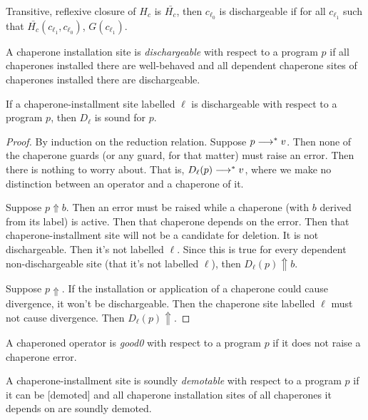 Transitive, reflexive closure of $H_c$ is $\bar{H_c}$,
then $c_{\ell_0}$ is dischargeable if for all $c_{\ell_1}$ such that $\bar{H_c}(c_{\ell_1},c_{\ell_0})$, $G(c_{\ell_1})$.

\begin{definition}
A chaperone installation site is \emph{dischargeable} with respect to a program $p$ if all chaperones installed there are well-behaved and all dependent chaperone sites of chaperones installed there are dischargeable.
\end{definition}

\begin{theorem}
If a chaperone-installment site labelled $\ell$ is dischargeable with respect to a program $p$, then $D_\ell$ is sound for $p$.
\end{theorem}

\begin{proof}
By induction on the reduction relation.
Suppose $p\longrightarrow^{*} v$.
Then none of the chaperone guards (or any guard, for that matter) must raise an error.
Then there is nothing to worry about.
That is, $D_\ell(p)\longrightarrow^{*} v$, where we make no distinction between an operator and a chaperone of it.

Suppose $p\Uparrow b$. 
Then an error must be raised while a chaperone (with $b$ derived from its label) is active.
Then that chaperone depends on the error.
Then that chaperone-installment site will not be a candidate for deletion.
It is not dischargeable.
Then it's not labelled $\ell$.
Since this is true for every dependent non-dischargeable site (that it's not labelled $\ell$), then $D_\ell(p)\Uparrow b$.

Suppose $p\Uparrow$.
If the installation or application of a chaperone could cause divergence, it won't be dischargeable.
Then the chaperone site labelled $\ell$ must not cause divergence.
Then $D_\ell(p)\Uparrow$.
\end{proof}

\begin{definition}
A chaperoned operator is \emph{good0} with respect to a program $p$ if it does not raise a chaperone error.
\end{definition}

\begin{definition}
A chaperone-installment site is soundly \emph{demotable} with respect to a program $p$ if it can be [demoted] and all chaperone installation sites of all chaperones it depends on are soundly demoted.
\end{definition}

